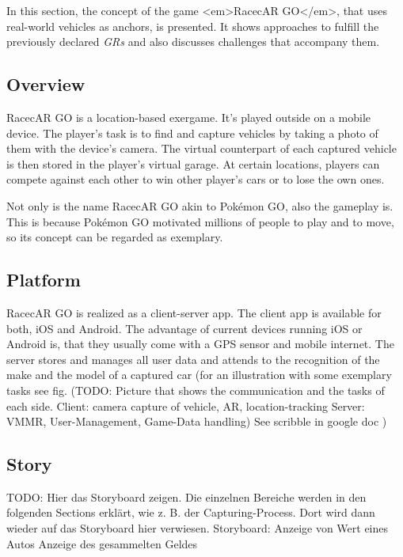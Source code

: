 In this section, the concept of the game <em>RacecAR GO</em>, that uses real-world vehicles as anchors, is presented. It shows approaches to fulfill the previously declared \emph{GRs} and also discusses challenges that accompany them.

\subsection{Overview}
RacecAR GO is a location-based exergame. It’s played outside on a mobile device. The player’s task is to find and capture vehicles by taking a photo of them with the device’s camera. The virtual counterpart of each captured vehicle is then stored in the player’s virtual garage. At certain locations, players can compete against each other to win other player’s cars or to lose the own ones.

Not only is the name RacecAR GO akin to Pokémon GO, also the gameplay is. This is because Pokémon GO motivated millions of people to play and to move, so its concept can be regarded as exemplary.

\subsection{Platform}
RacecAR GO is realized as a client-server app. The client app is available for both, iOS and Android. The advantage of current devices running iOS or Android is, that they usually come with a GPS sensor and mobile internet. The server stores and manages all user data and attends to the recognition of the make and the model of a captured car (for an illustration with some exemplary tasks see fig. (TODO: Picture that shows the communication and the tasks of each side.
Client: camera capture of vehicle, AR, location-tracking
Server: VMMR, User-Management, Game-Data handling)
See scribble in google doc
)

\subsection{Story}
TODO:
Hier das Storyboard zeigen. Die einzelnen Bereiche werden in den folgenden Sections erklärt, wie z. B. der Capturing-Process. Dort wird dann wieder auf das Storyboard hier verwiesen.
Storyboard:
Anzeige von Wert eines Autos
Anzeige des gesammelten Geldes

